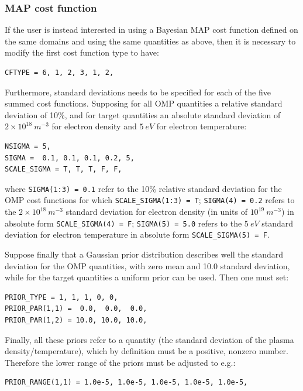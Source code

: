 \subsubsection{MAP cost function}

If the user is instead interested in using a Bayesian MAP cost function defined on the same domains and using the same quantities as above, then it is necessary to modify the first cost function type to have:
\begin{verbatim}
CFTYPE = 6, 1, 2, 3, 1, 2,
\end{verbatim}

Furthermore, standard deviations needs to be specified for each of the five summed cost functions. Supposing for all OMP quantities a relative standard deviation of 10\%, and for target quantities an absolute standard deviation of $2 \times 10^{18}~m^{-3}$ for electron density and $5~eV$ for electron temperature:
\begin{verbatim}
NSIGMA = 5,
SIGMA =  0.1, 0.1, 0.1, 0.2, 5,
SCALE_SIGMA = T, T, T, F, F,
\end{verbatim}
where {\tt SIGMA(1:3) = 0.1} refer to the 10\% relative standard deviation for the OMP cost functions for which {\tt SCALE\_SIGMA(1:3) = T}; {\tt SIGMA(4) = 0.2} refers to the $2 \times 10^{18}~m^{-3}$ standard deviation for electron density (in units of $10^{19}~m^{-3}$) in absolute form {\tt SCALE\_SIGMA(4) = F}; {\tt SIGMA(5) = 5.0} refers to the $5~eV$ standard deviation for electron temperature in absolute form {\tt SCALE\_SIGMA(5) = F}.

Suppose finally that a Gaussian prior distribution describes well the standard deviation for the OMP quantities, with zero mean and 10.0 standard deviation, while for the target quantities a uniform prior can be used. Then one must set:
\begin{verbatim}
PRIOR_TYPE = 1, 1, 1, 0, 0,
PRIOR_PAR(1,1) =  0.0,  0.0,  0.0,
PRIOR_PAR(1,2) = 10.0, 10.0, 10.0,
\end{verbatim}

Finally, all these priors refer to a quantity (the standard deviation of the plasma density/temperature), which by definition must be a positive, nonzero number. Therefore the lower range of the priors must be adjusted to e.g.:
\begin{verbatim}
PRIOR_RANGE(1,1) = 1.0e-5, 1.0e-5, 1.0e-5, 1.0e-5, 1.0e-5,
\end{verbatim}

